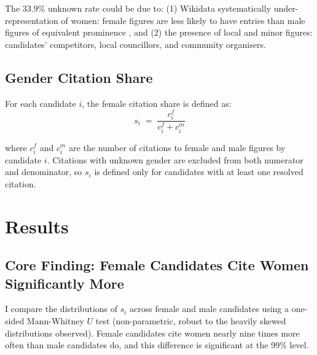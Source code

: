 \documentclass{article}
\begin{document}
The 33.9\% unknown rate could be due to: (1) Wikidata systematically under-representation of women: female figures are less likely to have entries than male figures of equivalent prominence \cite{wagner2015}, and (2) the presence of local and minor figures: candidates' competitors, local councillors, and community organisers.

\subsection{Gender Citation Share}

For each candidate $i$, the female citation share is defined as:
%
\begin{equation}                            
    s_i \;=\; \frac{c_i^f}{c_i^f + c_i^m}                                         
\label{eq:share}                          
\end{equation}     

%   
where $c_i^f$ and $c_i^m$ are the number of citations to female and male figures by candidate $i$. Citations with unknown gender are excluded from both numerator and denominator, so $s_i$ is defined only for candidates with at least one resolved citation. 

\section{Results}

\subsection{Core Finding: Female Candidates Cite Women Significantly More}

I compare the distributions of $s_i$ across female and male candidates using a one-sided Mann-Whitney $U$ test (non-parametric, robust to the heavily skewed distributions observed). Female candidates cite women nearly nine times more often than male candidates do, and this difference is significant at the 99\% level. 


\begin{table}[h]                                          
    \centering
    \small
     
    \caption{Mann-Whitney $U$ comparing men and women distributions (one-sided, $H_1$: female candidates cite women more than male candidates).}            
    \label{tab:mw}
\end{table}
\end{document}
